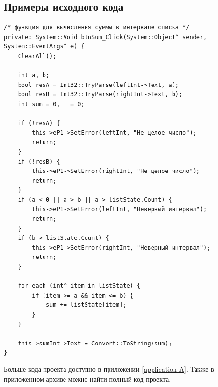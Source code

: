 \subsection{Примеры исходного кода}
\begin{verbatim}
/* функция для вычисления суммы в интервале списка */
private: System::Void btnSum_Click(System::Object^ sender, System::EventArgs^ e) {
    ClearAll();
    
    int a, b;
    bool resA = Int32::TryParse(leftInt->Text, a);
    bool resB = Int32::TryParse(rightInt->Text, b);
    int sum = 0, i = 0;
    
    if (!resA) {
        this->eP1->SetError(leftInt, "Не целое число");
        return;
    }
    if (!resB) {
        this->eP1->SetError(rightInt, "Не целое число");
        return;
    }
    if (a < 0 || a > b || a > listState.Count) {
        this->eP1->SetError(leftInt, "Неверный интервал");
        return;
    }
    if (b > listState.Count) {
        this->eP1->SetError(rightInt, "Неверный интервал");
        return;
    }

    for each (int^ item in listState) {
        if (item >= a && item <= b) {
            sum += listState[item];
        }
    }

    this->sumInt->Text = Convert::ToString(sum);
}
\end{verbatim}

Больше кода проекта доступно в приложении \ref{application-A}. Также в приложенном архиве можно найти полный код проекта.
